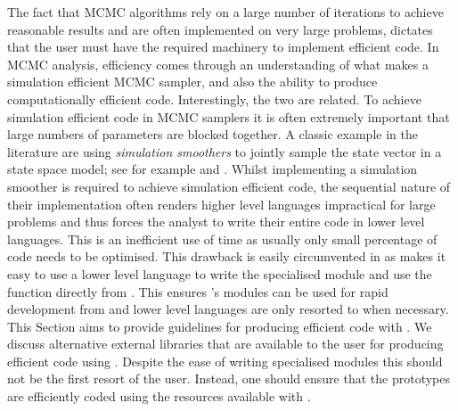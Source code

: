 \documentclass[article]{jss}
\begin{document}
The fact that MCMC algorithms rely on a large number of iterations to
achieve reasonable results and are often implemented on very large
problems, dictates that the user must have the required machinery to
implement efficient code. In MCMC analysis, efficiency comes through
an understanding of what makes a simulation efficient MCMC sampler,
and also the ability to produce computationally efficient code.
Interestingly, the two are related. To achieve simulation efficient
code in MCMC samplers it is often extremely important that large
numbers of parameters are blocked together. A classic example in the
literature are using \emph{simulation smoothers }to jointly sample the
state vector in a state space model; see for
example\citet{CarterKohn1994} and \citet{deJongShepard1995}.  Whilst
implementing a simulation smoother is required to achieve simulation
efficient code, the sequential nature of their implementation often
renders higher level languages impractical for large problems and thus
forces the analyst to write their entire code in lower level
languages. This is an inefficient use of time as usually only small
percentage of code needs to be optimised. This drawback is easily
circumvented in  as  makes it easy to use
a lower level language to write the specialised module and use the
function directly from . This ensures 's
modules can be used for rapid development from  and
lower level languages are only resorted to when necessary.  This
Section aims to provide guidelines for producing efficient code with
. We discuss alternative external libraries that are
available to the user for producing efficient code using .
Despite the ease of writing specialised modules this should not be the
first resort of the user. Instead, one should ensure that the
 prototypes are efficiently coded using the resources
available with .
\end{document}
